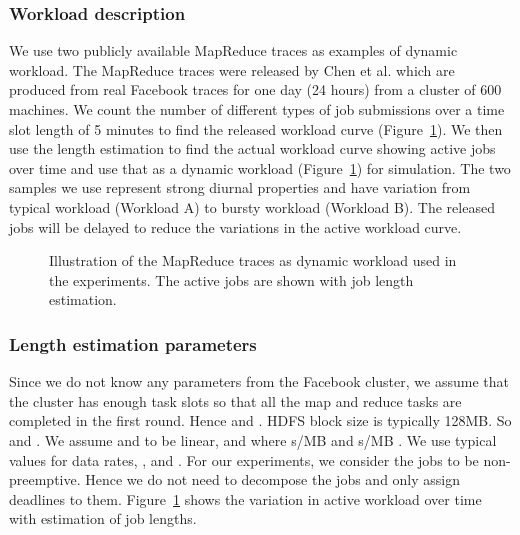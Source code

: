 \documentclass[10pt,conference,compsocconf,letterpaper]{IEEEtran}
\begin{document}
\subsubsection*{Workload description}
We use two publicly available MapReduce traces as examples of dynamic workload. The MapReduce traces were released by Chen et al. \cite{n4} which are produced from real Facebook traces for one day (24 hours) from a cluster of 600 machines. We count the number of different types of job submissions over a time slot length of 5 minutes to find the released workload curve (Figure~\ref{fig:workload}). We then use the length estimation to find the actual workload curve showing active jobs over time and use that as a dynamic workload (Figure~\ref{fig:workload}) for simulation. The two samples we use represent strong diurnal properties and have variation from typical workload (Workload A) to bursty workload (Workload B). The released jobs will be delayed to reduce the variations in the active workload curve.


\begin{figure}[!t]
\centerline{
\hfil
{}}
\caption{Illustration of the MapReduce traces as dynamic workload used in the experiments. The active jobs are shown with job length estimation.}
\label{fig:workload}
\end{figure}


\subsubsection*{Length estimation parameters}
Since we do not know any parameters from the Facebook cluster, we assume that the cluster has enough task slots so that all the map and reduce tasks are completed in the first round. Hence  and . HDFS block size is typically 128MB. So  and . We assume  and  to be linear,  and  where s/MB and s/MB \cite{Estimation_MapReduce}. We use typical values for data rates, ,  and  \cite{n9,Estimation_MapReduce}. For our experiments, we consider the jobs to be non-preemptive. Hence we do not need to decompose the jobs and only assign deadlines to them. Figure~\ref{fig:workload} shows the variation in active workload over time with estimation of job lengths.
\end{document}
